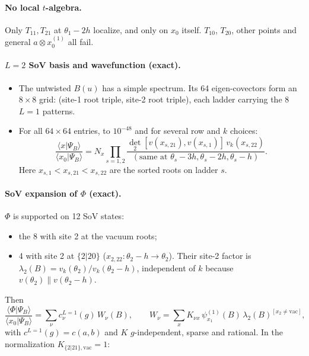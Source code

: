 \documentclass[11pt]{article}
\newcommand{\vac}{\mathrm{vac}}
\begin{document}
\paragraph{No local $t$-algebra.} Only $T_{11},T_{21}$ at $\theta_1-2h$ localize, and only on $x_0$ itself. $T_{10}$, $T_{20}$, other points and general $a\otimes x_0^{(1)}$ all fail.

\paragraph{$L=2$ SoV basis and wavefunction (exact).}
\begin{itemize}
\item The untwisted $B(u)$ has a simple spectrum. Its 64 eigen-covectors form an $8\times8$ grid: (site-1 root triple, site-2 root triple), each ladder carrying the 8 $L=1$ patterns.
\item For all $64\times64$ entries, to $10^{-48}$ and for several row and $k$ choices:
\[
\frac{\langle x|\Psi_B\rangle}{\langle x_0|\Psi_B\rangle}=N_x\prod_{s=1,2}\frac{\det_2[v(x_{s,21}),v(x_{s,1})]\,v_k(x_{s,22})}{(\text{same at }\theta_s-3h,\theta_s-2h,\theta_s-h)} .
\]
Here $x_{s,1}<x_{s,21}<x_{s,22}$ are the sorted roots on ladder $s$.
\end{itemize}

\paragraph{SoV expansion of $\Phi$ (exact).} $\Phi$ is supported on 12 SoV states:
\begin{itemize}
\item the 8 with site 2 at the vacuum roots;
\item 4 with site 2 at $\{2|20\}$ ($x_{2,22}:\theta_2-h\to\theta_2$). Their site-2 factor is $\lambda_2(B)=v_k(\theta_2)/v_k(\theta_2-h)$, independent of $k$ because $v(\theta_2)\parallel v(\theta_2-h)$.
\end{itemize}
Then
\[
\frac{\langle\Phi|\Psi_B\rangle}{\langle x_0|\Psi_B\rangle}=\sum_\nu c^{L=1}_\nu(g)\,W_\nu(B),\qquad W_\nu=\sum_xK_{\nu x}\,\psi^{(1)}_{x_1}(B)\,\lambda_2(B)^{[x_2\neq\vac]} ,
\]
with $c^{L=1}(g)=c(a,b)$ and $K$ $g$-independent, sparse and rational. In the normalization $K_{\{2|21\},\vac}=1$:
\end{document}
